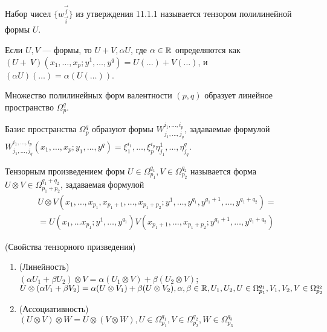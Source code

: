 \begin{Def}
	Набор чисел $\{w_{\overrightarrow{i}}^{\overrightarrow{j}}\}$ из утверждения 11.1.1 называется тензором полилинейной формы $U$.
\end{Def}

\begin{Def}
	Если $U, V$ --- формы, то $U+V, \alpha U$, где $\alpha\in\R$ определяются как $(U+~V)(x_1, \ldots, x_p; y^1, \ldots, y^q)=U(\ldots)+V(\ldots)$, и $(\alpha U)(\ldots)=\alpha(U(\ldots))$.
\end{Def}

\begin{prop}
	Множество полилинейных форм валентности $(p, q)$ образует линейное пространство $\Omega_p^q$.
\end{prop}

\begin{prop}
	Базис пространства $\Omega_p^q$ образуют формы $W_{j_1, \ldots, j_q}^{i_1, \ldots, i_p}$, задаваемые формулой $W_{j_1, \ldots, j_q}^{i_1, \ldots, i_p}(x_1, \ldots, x_p; y_1, \ldots, y^q)=\xi_1^{i_1}, \ldots, \xi_p^{i_p}\eta_{j_1}^1, \ldots, \eta_{j_q}^q$.
\end{prop}

\begin{Def}
	Тензорным произведением форм $U\in \Omega_{p_1}^{q_1}, V\in\Omega_{p_2}^{q_2}$ называется форма $U\otimes V\in \Omega_{p_1+p_2}^{q_1+q_2}$, задаваемая формулой
	\begin{multline*}
U\otimes V (x_1, \ldots, x_{p_1}, x_{p_1+1}, \ldots, x_{p_1+p_2}; y^1,\ldots, y^{q_1}, y^{q_1+1}, \ldots, y^{q_1+q_2})=\\=U(x_1, \ldots x_{p_1}; y^1, \ldots, y^{q_1})V(x_{p_1+1}, \ldots, x_{p_1+p_2}; y^{q_1+1}, \ldots, y^{q_1+q_2})
	\end{multline*} 
\end{Def}

\begin{prop}(Свойства тензорного призведения)
	\begin{enumerate}
		\item (Линейность) \\$(\alpha U_1+\beta U_2)\otimes V = \alpha(U_1\otimes V)+\beta(U_2\otimes V)$; \\
		$U\otimes (\alpha V_1+\beta V_2) = \alpha(U\otimes V_1)+\beta(U\otimes V_2), \alpha, \beta \in \R, U_1, U_2, U \in \Omega_{p_1}^{q_1}, V_1, V_2, V \in \Omega_{p_2}^{q_2}$
		\item (Ассоциативность) \\ $(U\otimes V)\otimes W = U\otimes (V\otimes W), U\in \Omega_{p_1}^{q_1}, V\in\Omega_{p_2}^{q_2}, W\in\Omega_{p_3}^{q_3}$
	\end{enumerate}
\end{prop}

